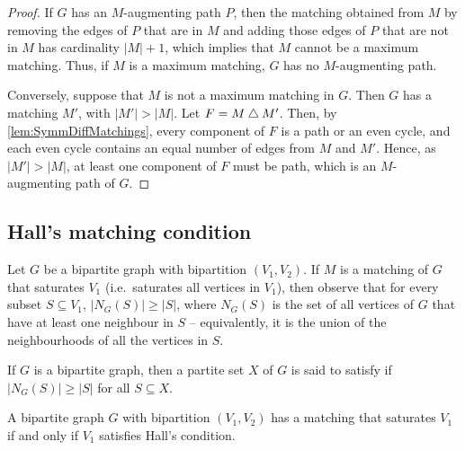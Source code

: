 \begin{proof}
If $G$ has an $M$-augmenting path $P$, then the matching obtained from $M$ by removing the edges of $P$ that are in $M$ and adding those edges of $P$ that are not in $M$ has cardinality $|M| + 1$, which implies that $M$ cannot be a maximum matching. Thus, if $M$ is a maximum matching, $G$ has no $M$-augmenting path.

Conversely, suppose that $M$ is not a maximum matching in $G$. Then $G$ has a matching $M'$, with $|M'| > |M|$. Let $F = M \mathbin{\triangle} M'$. Then, by \cref{lem:SymmDiffMatchings}, every component of $F$ is a path or an even cycle, and each even cycle contains an equal number of edges from $M$ and $M'$. Hence, as $|M'| > |M|$, at least one component of $F$ must be path, which is an $M$-augmenting path of $G$.
\end{proof}

\subsection*{Hall's matching condition}\label{subsec:Hall}
Let $G$ be a bipartite graph with bipartition $(V_1, V_2)$. If $M$ is a matching of $G$ that saturates $V_1$ (i.e.\ saturates all vertices in $V_1$), then observe that for every subset $S \subseteq V_1$, $|N_G(S)| \ge |S|$, where $N_G(S)$ is the set of all vertices of $G$ that have at least one neighbour in $S$ -- equivalently, it is the union of the neighbourhoods of all the vertices in $S$.

If $G$ is a bipartite graph, then a partite set $X$ of $G$ is said to satisfy  if $|N_G(S)| \ge |S|$ for all $S \subseteq X$.

\begin{Theorem}\label{thm:Hall}
A bipartite graph $G$ with bipartition $(V_1, V_2)$ has a matching that saturates $V_1$ if and only if $V_1$ satisfies Hall's condition.
\end{Theorem}

